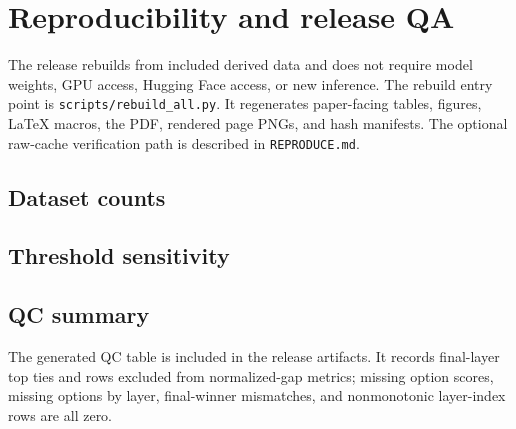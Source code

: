 \section{Reproducibility and release QA}

The release rebuilds from included derived data and does not require model weights, GPU access, Hugging Face access, or new inference. The rebuild entry point is \texttt{scripts/rebuild\_all.py}. It regenerates paper-facing tables, figures, LaTeX macros, the PDF, rendered page PNGs, and hash manifests. The optional raw-cache verification path is described in \texttt{REPRODUCE.md}.

\subsection{Dataset counts}

\begin{center}
\small

\label{tab:dataset-counts}
\end{center}

\subsection{Threshold sensitivity}

\begin{center}
\small

\label{tab:threshold-summary}
\end{center}

\subsection{QC summary}

The generated QC table is included in the release artifacts. It records \FinalLayerTieCount{} final-layer top ties and \NormalizedGapExcludedCount{} rows excluded from normalized-gap metrics; missing option scores, missing options by layer, final-winner mismatches, and nonmonotonic layer-index rows are all zero.
